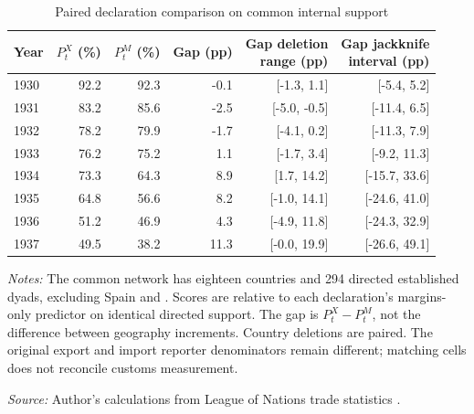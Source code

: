 \begin{table}[!htbp]\centering
\caption{Paired declaration comparison on common internal support}\label{tab:app_matched}
\begin{threeparttable}\small\setlength{\tabcolsep}{4pt}
\begin{tabular}{@{}lrrrrr@{}}
\toprule
Year & $P^X_t$ (\%) & $P^M_t$ (\%) & Gap (pp) & \shortstack{Gap deletion\\range (pp)} & \shortstack{Gap jackknife\\interval (pp)} \\
\midrule
1930 & 92.2 & 92.3 & -0.1 & [-1.3, 1.1] & [-5.4, 5.2] \\
1931 & 83.2 & 85.6 & -2.5 & [-5.0, -0.5] & [-11.4, 6.5] \\
1932 & 78.2 & 79.9 & -1.7 & [-4.1, 0.2] & [-11.3, 7.9] \\
1933 & 76.2 & 75.2 & 1.1 & [-1.7, 3.4] & [-9.2, 11.3] \\
1934 & 73.3 & 64.3 & 8.9 & [1.7, 14.2] & [-15.7, 33.6] \\
1935 & 64.8 & 56.6 & 8.2 & [-1.0, 14.1] & [-24.6, 41.0] \\
1936 & 51.2 & 46.9 & 4.3 & [-4.9, 11.8] & [-24.3, 32.9] \\
1937 & 49.5 & 38.2 & 11.3 & [-0.0, 19.9] & [-26.6, 49.1] \\
\bottomrule
\end{tabular}
\begin{tablenotes}[flushleft]\footnotesize\item \textit{Notes:} The common network has eighteen countries and 294 directed established dyads, excluding Spain and \External{}. Scores are relative to each declaration's margins-only predictor on identical directed support. The gap is $P^X_t-P^M_t$, not the difference between geography increments. Country deletions are paired. The original export and import reporter denominators remain different; matching cells does not reconcile customs measurement.
\item \textit{Source:} Author's calculations from League of Nations trade statistics \parencite{league1930,league1936,league1938}.
\end{tablenotes}\end{threeparttable}\end{table}
